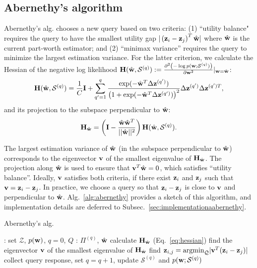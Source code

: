 \documentclass[onecolumn,11pt]{article}
\begin{document}
\subsection{Abernethy's algorithm}
\label{subsec:benchmark}
Abernethy's alg. chooses a new query based on two criteria: (1) ``utility balance" requires the query to have the smallest utility gap $|\left({\bf z}_{i}-{\bf z}_{j}\right)^T\hat{\bf w}|$ where $\hat{\bf w}$ is the current part-worth estimator; and (2) ``minimax variance'' requires the query to minimize the largest estimation variance. For the latter criterion, we calculate the Hessian of the negative log likelihood ${\bf H}(\hat{\bf w},\mathcal{S}^{(q)}):=\frac{\partial^2 \left(-\log p({\bf w};\mathcal{S}^{(q)})\right)}{\partial {\bf w}^2}|_{{\bf w}=\hat{\bf w}}$:
\begin{equation}
{\bf H}(\hat{\bf w},\mathcal{S}^{(q)}) = \frac{1}{C}{\bf I} + \sum_{q'=1}^{q} \frac{\exp(-\hat{\bf w}^T\Delta {\bf z}^{(q')})}{\left(1+\exp(-\hat{\bf w}^T\Delta {\bf z}^{(q')})\right)^2}\Delta {\bf z}^{(q')}\Delta {\bf z}^{(q')T},
\label{eq:hessian}
\end{equation}
and its projection to the subspace perpendicular to $\hat{\bf w}$:
\begin{equation}
{\bf H}_{\hat{\bf w}} = \left({\bf I} - \frac{\hat{\bf w}\hat{\bf
w}^T}{||\hat{\bf w}||^2}\right){\bf H}(\hat{\bf w},\mathcal{S}^{(q)}).
\label{eq:hessianproj}
\end{equation}

The largest estimation variance of $\hat{\bf w}$ (in the subspace perpendicular to $\hat{\bf w}$) corresponds to the eigenvector ${\bf v}$ of the smallest eigenvalue of ${\bf H}_{\hat{\bf w}}$. The projection along $\hat{\bf w}$ is used to ensure that ${\bf v}^T\hat{\bf w}=0$, which satisfies ``utility balance''. Ideally, ${\bf v}$ satisfies both criteria, if there exist ${\bf z}_{i}$ and ${\bf z}_{j}$ such that ${\bf v}={\bf z}_{i}-{\bf z}_{j}$. In practice, we choose a query so that ${\bf z}_{i}-{\bf z}_{j}$ is close to ${\bf v}$ and perpendicular to $\hat{\bf w}$. Alg.~\ref{alg:abernethy} provides a sketch of this algorithm, and implementation details are deferred to Subsec.~\ref{sec:implementationaabernethy}.

\begin{algorithm}
\caption{Abernethy's alg.}\label{alg:abernethy}
\begin{algorithmic}[1]
: set $\mathcal{Z}$, $p({\bf w})$, $q=0$, $Q$
: $\Pi^{(q)}$, $\hat{\bf w}$
\State calculate ${\bf H}_{\hat{\bf w}}$ (Eq.~\eqref{eq:hessian})
\State find the eigenvector ${\bf v}$ of the smallest eigenvalue of ${\bf H}_{\hat{\bf w}}$
\State find ${\bf z}_{i,j} = \text{argmin}_{\mathcal{Q}}|{\bf v}^T({\bf z}_{i}-{\bf z}_{j})|$
\State collect query response, set $q=q+1$, update $\mathcal{S}^{(q)}$ and $p({\bf w};\mathcal{S}^{(q)})$
\EndWhile
\end{algorithmic}
\end{algorithm}
\end{document}
